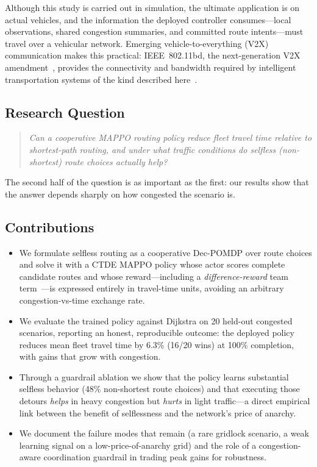 Although this study is carried out in simulation, the ultimate application is on actual
vehicles, and the information the deployed controller consumes---local observations,
shared congestion summaries, and committed route intents---must travel over a vehicular
network. Emerging vehicle-to-everything (V2X) communication makes this practical:
IEEE~802.11bd, the next-generation V2X amendment~\cite{ieee80211bd}, provides the
connectivity and bandwidth required by intelligent transportation systems of the kind
described here~\cite{iliopoulos2025bd}.

\subsection{Research Question}
\begin{quote}
\emph{Can a cooperative MAPPO routing policy reduce fleet travel time relative to
shortest-path routing, and under what traffic conditions do selfless (non-shortest)
route choices actually help?}
\end{quote}
The second half of the question is as important as the first: our results show that the
answer depends sharply on how congested the scenario is.

\subsection{Contributions}
\begin{itemize}
  \item We formulate selfless routing as a cooperative Dec-POMDP over route choices and
  solve it with a CTDE MAPPO policy whose actor scores complete candidate routes and
  whose reward---including a \emph{difference-reward} team term~\cite{wolpert2001collectives}---is
  expressed entirely in travel-time units, avoiding an arbitrary congestion-vs-time
  exchange rate.
  \item We evaluate the trained policy against Dijkstra on 20 held-out congested scenarios,
  reporting an honest, reproducible outcome: the deployed policy reduces mean fleet travel
  time by 6.3\% (16/20 wins) at 100\% completion, with gains that grow with congestion.
  \item Through a guardrail ablation we show that the policy learns substantial selfless
  behavior (48\% non-shortest route choices) and that executing those detours \emph{helps}
  in heavy congestion but \emph{hurts} in light traffic---a direct empirical link between
  the benefit of selflessness and the network's price of anarchy.
  \item We document the failure modes that remain (a rare gridlock scenario, a weak
  learning signal on a low-price-of-anarchy grid) and the role of a congestion-aware
  coordination guardrail in trading peak gains for robustness.
\end{itemize}
